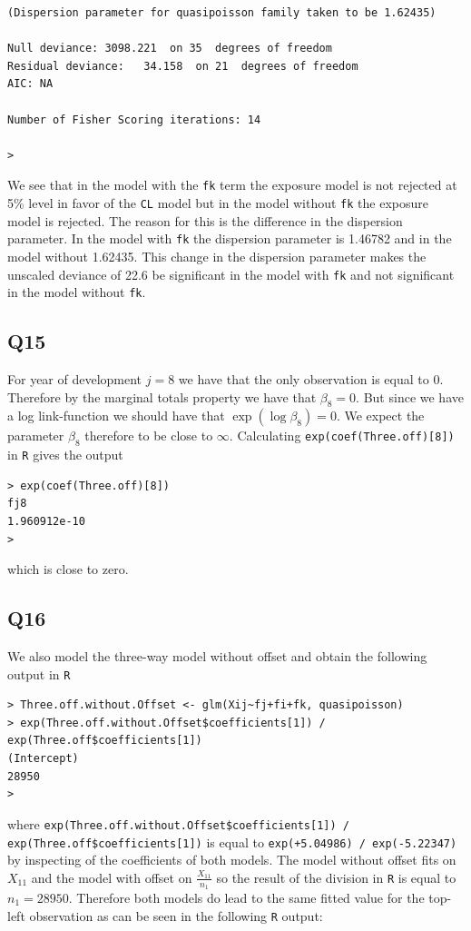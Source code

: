 \documentclass[11pt]{article}
\begin{document}
\begin{verbatim}
(Dispersion parameter for quasipoisson family taken to be 1.62435)

Null deviance: 3098.221  on 35  degrees of freedom
Residual deviance:   34.158  on 21  degrees of freedom
AIC: NA

Number of Fisher Scoring iterations: 14

>
\end{verbatim}

We see that in the model with the \verb|fk| term the exposure model is not rejected at 5\% level in favor of the \verb|CL| model but in the model without \verb|fk| the exposure model is rejected. The reason for this is the difference in the dispersion parameter. In the model with \verb|fk| the dispersion parameter is 1.46782 and in the model without 1.62435. This change in the dispersion parameter makes the unscaled deviance of 22.6 be significant in the model with \verb|fk| and not significant in the model without \verb|fk|.

\subsection*{Q15}
For year of development $j=8$ we have that the only observation is equal to 0. Therefore by the marginal totals property we have that $\beta_8 = 0$. But since we have a log link-function we should have that $\exp(\log \beta_8) = 0$. We expect the parameter $\beta_8$ therefore to be close to $\infty$. Calculating \verb|exp(coef(Three.off)[8])| in \verb|R| gives the output 
\begin{verbatim}
> exp(coef(Three.off)[8])
fj8 
1.960912e-10 
>
\end{verbatim}
which is close to zero.

\subsection*{Q16}
We also model the three-way model without offset and obtain the following output in \verb|R|
\begin{verbatim}
> Three.off.without.Offset <- glm(Xij~fj+fi+fk, quasipoisson)
> exp(Three.off.without.Offset$coefficients[1]) / exp(Three.off$coefficients[1])
(Intercept) 
28950 
>
\end{verbatim}
where \verb|exp(Three.off.without.Offset$coefficients[1]) / exp(Three.off$coefficients[1])| is equal to \verb|exp(+5.04986) / exp(-5.22347)| by inspecting of the coefficients of both models. The model without offset fits on $X_{11}$ and the model with offset on $\frac{X_{11}}{n_1}$ so the result of the division in \verb|R| is equal to $n_1 = 28950$. Therefore both models do lead to the same fitted value for the top-left observation as can be seen in the following \verb|R| output:
\end{document}
